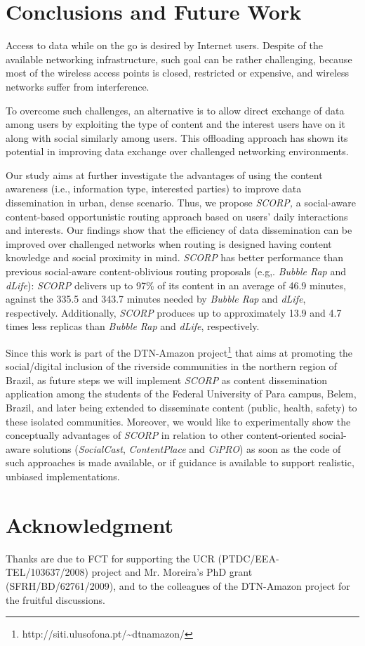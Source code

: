 \documentclass[lnicst]{svmultln}
\begin{document}
\section{Conclusions and Future Work\label{sec:Conclusions-and-Future}}

Access to data while on the go is desired by Internet users. Despite
of the available networking infrastructure, such goal can be rather
challenging, because most of the wireless access points is closed,
restricted or expensive, and wireless networks suffer from interference.

To overcome such challenges, an alternative is to allow direct exchange
of data among users by exploiting the type of content and the interest
users have on it \cite{socialcast,contentplace} along with social
similarly \cite{bubble2011,dlife,cipro} among users. This offloading
approach has shown its potential in improving data exchange over challenged
networking environments. 

Our study aims at further investigate the advantages of using the
content awareness (i.e., information type, interested parties) to
improve data dissemination in urban, dense scenario. Thus, we propose
\emph{SCORP,} a social-aware content-based opportunistic routing approach
based on users' daily interactions and interests. Our findings show
that the efficiency of data dissemination can be improved over challenged
networks when routing is designed having content knowledge and social
proximity in mind. \emph{SCORP} has better performance than previous
social-aware content-oblivious routing proposals (e.g,. \emph{Bubble
Rap} and \emph{dLife}): \emph{SCORP} delivers up to 97\% of its content
in an average of 46.9 minutes, against the 335.5 and 343.7 minutes
needed by \emph{Bubble Rap} and \emph{dLife}, respectively. Additionally,
\emph{SCORP} produces up to approximately 13.9 and 4.7 times less
replicas than \emph{Bubble Rap} and \emph{dLife}, respectively.

Since this work is part of the DTN-Amazon project\footnote{http://siti.ulusofona.pt/\textasciitilde{}dtnamazon/} that aims at promoting the social/digital inclusion of the riverside
communities in the northern region of Brazil, as future steps we will
implement \emph{SCORP} as content dissemination application among
the students of the Federal University of Para campus, Belem, Brazil,
and later being extended to disseminate content (public, health, safety)
to these isolated communities. Moreover, we would like to experimentally
show the conceptually advantages of \emph{SCORP} in relation to other
content-oriented social-aware solutions (\emph{SocialCast}, \emph{ContentPlace}
and \emph{CiPRO})\emph{ }as soon as the code of such approaches is
made available, or if guidance is available to support realistic,
unbiased implementations.


\section*{Acknowledgment}

Thanks are due to FCT for supporting the UCR (PTDC/EEA-TEL/103637/2008)
project and Mr. Moreira's PhD grant (SFRH/BD/62761/2009), and to the
colleagues of the DTN-Amazon project for the fruitful discussions.




\end{document}
